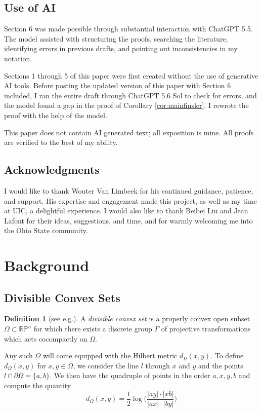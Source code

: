 \documentclass[letterpaper, 11pt, reqno]{amsart}
\theoremstyle{definition}
\newtheorem{dfn}[thm]{Definition}
\begin{document}
\subsection*{Use of AI} Section 6 was made possible through substantial interaction with ChatGPT 5.5. The model assisted with structuring the proofs, searching the literature, identifying errors in previous drafts, and pointing out inconsistencies in my notation. 

Sections 1 through 5 of this paper were first created without the use of generative AI tools. Before posting the updated version of this paper with Section 6 included, I ran the entire draft through ChatGPT 5.6 Sol to check for errors, and the model found a gap in the proof of Corollary \ref{cor:mainfinsler}. I rewrote the proof with the help of the model.

This paper does not contain AI generated text; all exposition is mine. All proofs are verified to the best of my ability.

\subsection*{Acknowledgments} I would like to thank Wouter Van Limbeek for his continued guidance, patience, and support. His expertise and engagement made this project, as well as my time at UIC, a delightful experience. I would also like to thank Beibei Liu and Jean Lafont for their ideas, suggestions, and time, and for warmly welcoming me into the Ohio State community.

\section{Background}\label{sec:background}

\subsection{Divisible Convex Sets}

\begin{dfn}[see e.g.\cite{Benoist}]
    A \emph{divisible convex set} is a properly convex open subset $\Omega \subset \mathbb{RP}^n$ for which there exists a discrete group $\Gamma$ of projective transformations which acts cocompactly on $\Omega$.
\end{dfn}

Any such $\Omega$ will come equipped with the Hilbert metric $d_\Omega(x,y)$. To define $d_\Omega(x,y)$ for $x,y \in \Omega$, we consider the line $l$ through $x$ and $y$ and the points $l \cap \partial \Omega = \{a,b\}$. We then have the quadruple of points in the order $a,x,y,b$ and compute the quantity
\begin{equation}
d_\Omega(x,y) = \frac{1}{2} \log \bigg( \frac{|ay| \cdot |xb|}{|ax| \cdot |by|} \bigg)
\end{equation} 
\end{document}
